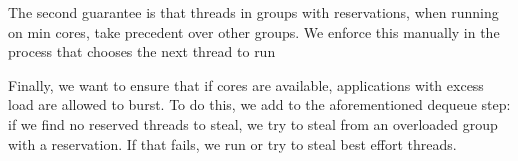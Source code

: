 The second guarantee is that threads in groups with reservations, when running
on min cores, take precedent over other groups. We enforce this manually in the
process that chooses the next thread to run 

Finally, we want to ensure that if cores are available, applications with excess
load are allowed to burst. To do this, we add to the aforementioned dequeue
step: if we find no reserved threads to steal, we try to steal from an
overloaded group with a reservation. If that fails, we run or try to steal best
effort threads.




